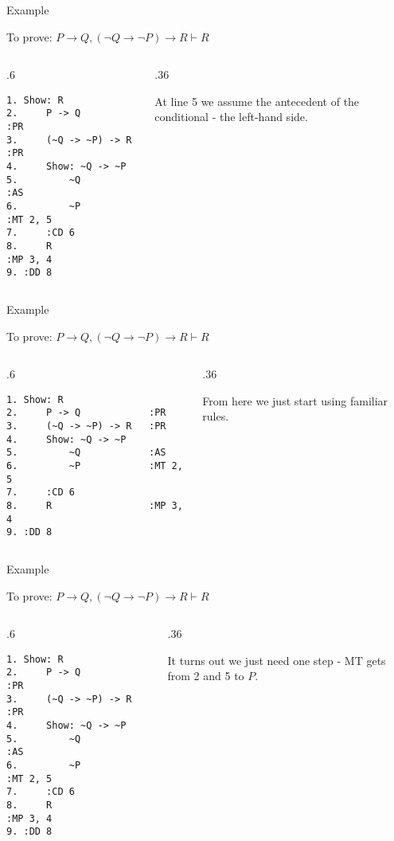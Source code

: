 \documentclass[
  ignorenonframetext,
]{beamer}
\renewcommand{\,}{\text{, }}
\def\begincols{\begin{columns}}
\def\begincol{\begin{column}}
\def\endcol{\end{column}}
\def\endcols{\end{columns}}
\begin{document}
\begin{frame}[fragile]{Example}
\protect\hypertarget{example-5}{}

To prove:
\(P \rightarrow Q, (\neg Q \rightarrow \neg P) \rightarrow R \vdash R\)

\bigskip

\begincols
\begincol{.6\textwidth}

\begin{verbatim}
1. Show: R
2.     P -> Q            :PR
3.     (~Q -> ~P) -> R   :PR
4.     Show: ~Q -> ~P
5.         ~Q            :AS
6.         ~P            :MT 2, 5
7.     :CD 6
8.     R                 :MP 3, 4
9. :DD 8
\end{verbatim}

\endcol
\begincol{.36\textwidth}

At line 5 we assume the antecedent of the conditional - the left-hand
side.

\endcol
\endcols

\end{frame}

\begin{frame}[fragile]{Example}
\protect\hypertarget{example-6}{}

To prove:
\(P \rightarrow Q, (\neg Q \rightarrow \neg P) \rightarrow R \vdash R\)

\bigskip

\begincols
\begincol{.6\textwidth}

\begin{verbatim}
1. Show: R
2.     P -> Q            :PR
3.     (~Q -> ~P) -> R   :PR
4.     Show: ~Q -> ~P
5.         ~Q            :AS
6.         ~P            :MT 2, 5
7.     :CD 6
8.     R                 :MP 3, 4
9. :DD 8
\end{verbatim}

\endcol
\begincol{.36\textwidth}

From here we just start using familiar rules.

\endcol
\endcols

\end{frame}

\begin{frame}[fragile]{Example}
\protect\hypertarget{example-7}{}

To prove:
\(P \rightarrow Q, (\neg Q \rightarrow \neg P) \rightarrow R \vdash R\)

\bigskip

\begincols
\begincol{.6\textwidth}

\begin{verbatim}
1. Show: R
2.     P -> Q            :PR
3.     (~Q -> ~P) -> R   :PR
4.     Show: ~Q -> ~P
5.         ~Q            :AS
6.         ~P            :MT 2, 5
7.     :CD 6
8.     R                 :MP 3, 4
9. :DD 8
\end{verbatim}

\endcol
\begincol{.36\textwidth}

It turns out we just need one step - MT gets from 2 and 5 to \(P\).

\endcol
\endcols

\end{frame}
\end{document}
